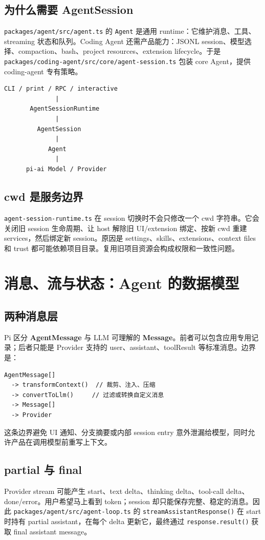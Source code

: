 \documentclass[UTF8,openany,11pt]{ctexbook}
\newcommand{\pathref}[1]{\texttt{#1}}
\newcommand{\term}[1]{\textbf{#1}}
\begin{document}
\section{为什么需要 AgentSession}
\pathref{packages/agent/src/agent.ts} 的 \texttt{Agent} 是通用 runtime：它维护消息、工具、streaming 状态和队列。Coding Agent 还需产品能力：JSONL session、模型选择、compaction、bash、project resources、extension lifecycle。于是 \pathref{packages/coding-agent/src/core/agent-session.ts} 包装 core Agent，提供 coding-agent 专有策略。

\begin{Verbatim}[fontsize=\small]
CLI / print / RPC / interactive
              |
       AgentSessionRuntime
              |
         AgentSession
              |
            Agent
              |
      pi-ai Model / Provider
\end{Verbatim}

\section{cwd 是服务边界}
\pathref{agent-session-runtime.ts} 在 session 切换时不会只修改一个 cwd 字符串。它会关闭旧 session 生命周期、让 host 解除旧 UI/extension 绑定、按新 cwd 重建 services，然后绑定新 session。原因是 settings、skills、extensions、context files 和 trust 都可能依赖项目目录。复用旧项目资源会构成权限和一致性问题。

\chapter{消息、流与状态：Agent 的数据模型}

\section{两种消息层}
Pi 区分 \term{AgentMessage} 与 LLM 可理解的 \term{Message}。前者可以包含应用专用记录；后者只能是 Provider 支持的 user、assistant、toolResult 等标准消息。边界是：
\begin{Verbatim}[fontsize=\small]
AgentMessage[]
  -> transformContext()  // 裁剪、注入、压缩
  -> convertToLlm()     // 过滤或转换自定义消息
  -> Message[]
  -> Provider
\end{Verbatim}

这条边界避免 UI 通知、分支摘要或内部 session entry 意外泄漏给模型，同时允许产品在调用模型前重写上下文。

\section{partial 与 final}
Provider stream 可能产生 start、text delta、thinking delta、tool-call delta、done/error。用户希望马上看到 token；session 却只能保存完整、稳定的消息。因此 \pathref{packages/agent/src/agent-loop.ts} 的 \texttt{streamAssistantResponse()} 在 start 时持有 partial assistant，在每个 delta 更新它，最终通过 \texttt{response.result()} 获取 final assistant message。
\end{document}
